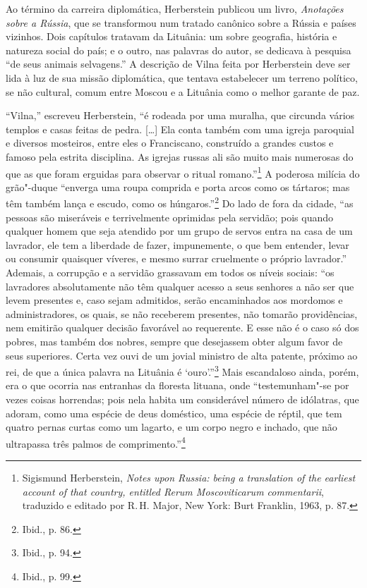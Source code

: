 Ao término da carreira diplomática, Herberstein publicou um livro,
\emph{Anotações sobre a Rússia}, que se transformou num tratado canônico
sobre a Rússia e países vizinhos. Dois capítulos tratavam da Lituânia:
um sobre geografia, história e natureza social do país; e o outro, nas
palavras do autor, se dedicava à pesquisa ``de seus animais selvagens.''
A descrição de Vilna feita por Herberstein deve ser lida à luz de sua
missão diplomática, que tentava estabelecer um terreno político, se não
cultural, comum entre Moscou e a Lituânia como o melhor garante de paz.

``Vilna,'' escreveu Herberstein, ``é rodeada por uma muralha, que
circunda vários templos e casas feitas de pedra. {[}\ldots{}{]} Ela
conta também com uma igreja paroquial e diversos mosteiros, entre eles o
Franciscano, construído a grandes custos e famoso pela estrita
disciplina. As igrejas russas ali são muito mais numerosas do que as que
foram erguidas para observar o ritual romano.''\footnote{Sigismund
  Herberstein, \emph{Notes upon Russia: being a translation of the
  earliest account of that country, entitled Rerum Moscoviticarum
  commentarii}, traduzido e editado por R.\,H. Major, New York: Burt
  Franklin, 1963, p. 87.} A poderosa milícia do grão"-duque ``enverga uma
roupa comprida e porta arcos como os tártaros; mas têm também lança e
escudo, como os húngaros.''\footnote{Ibid., p. 86.} Do lado de fora da
cidade, ``as pessoas são miseráveis e terrivelmente oprimidas pela
servidão; pois quando qualquer homem que seja atendido por um grupo de
servos entra na casa de um lavrador, ele tem a liberdade de fazer,
impunemente, o que bem entender, levar ou consumir quaisquer víveres, e
mesmo surrar cruelmente o próprio lavrador.'' Ademais, a corrupção e a
servidão grassavam em todos os níveis sociais: ``os lavradores
absolutamente não têm qualquer acesso a seus senhores a não ser que
levem presentes e, caso sejam admitidos, serão encaminhados aos mordomos
e administradores, os quais, se não receberem presentes, não tomarão
providências, nem emitirão qualquer decisão favorável ao requerente. E
esse não é o caso só dos pobres, mas também dos nobres, sempre que
desejassem obter algum favor de seus superiores. Certa vez ouvi de um
jovial ministro de alta patente, próximo ao rei, de que a única palavra
na Lituânia é `ouro'.''\footnote{Ibid., p. 94.} Mais escandaloso ainda,
porém, era o que ocorria nas entranhas da floresta lituana, onde
``testemunham"-se por vezes coisas horrendas; pois nela habita um
considerável número de idólatras, que adoram, como uma espécie de deus
doméstico, uma espécie de réptil, que tem quatro pernas curtas como um
lagarto, e um corpo negro e inchado, que não ultrapassa três palmos de
comprimento.''\footnote{Ibid., p. 99.}

